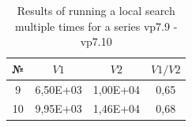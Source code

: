 \documentclass{ifacconf}
\begin{document}
\begin{table}[ht]
	\centering
	\begin{tabular}{|c|c|c|c|}
		\hline
		\hspace*{0.1cm}№\hspace*{0.1cm} &
		\hspace*{0.1cm}$V1$\hspace*{0.1cm}&
		\hspace*{0.1cm}$V2$\hspace*{0.1cm}&
		\hspace*{0.1cm}$V1/V2$\hspace*{0.1cm}\\
		\hline
		9  & 6,50E+03  &  1,00E+04  &  0,65\\
		10 & 9,95E+03  &  1,46E+04  &  0,68\\
		\hline
	\end{tabular}
	\caption{Results of running a local search multiple times for a series vp7.9 - vp7.10}	\label{spher_vp7}
\end{table}
\end{document}

